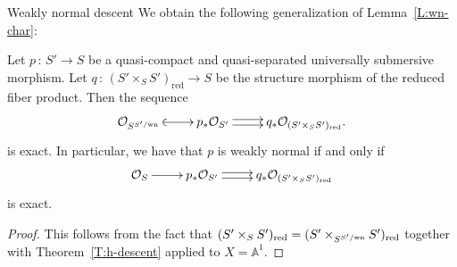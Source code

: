 \documentclass[a4paper,twoside,11pt]{amsart}[2009/07/02] %
\newcommand{\pref}[1]{\eqref{#1}}
\newcommand{\map}[3]{#1\,:\, #2\rightarrow #3}
\newcommand{\red}{\mathrm{red}}
\newcommand{\A}[1]{\mathbb{A}^{#1}}    %
\newcommand\sO{\mathcal{O}} %
\newcommand{\normcmd}[3]{%
#2%
\ifx\\#1\\%
^{\,\mathrm{#3}}%
\else%
^{#1/\mathrm{#3}}%
\fi%
}
\newcommand{\wn}[2]{\normcmd{#1}{#2}{wn}} %
\begin{document}
\begin{section}{Weakly normal descent}
We obtain the following generalization of Lemma~\pref{L:wn-char}:

\begin{corollary}
Let $\map{p}{S'}{S}$ be a quasi-compact and quasi-separated universally
submersive morphism. Let $\map{q}{(S'\times_S S')_\red}{S}$ be the structure
morphism of the reduced fiber product. Then the sequence
%
$$\xymatrix{
\sO_{\wn{S'}{S}}\ar@{(->}[r] & p_*\sO_{S'}\ar@<.5ex>[r] \ar@<-.5ex>[r] &
q_*\sO_{(S'\times_S S')_\red}.}$$
%
is exact. In particular, we have that $p$ is weakly normal if and only if
%
$$\xymatrix{
\sO_S\ar[r] & p_*\sO_{S'}\ar@<.5ex>[r] \ar@<-.5ex>[r] &
q_*\sO_{(S'\times_S S')_\red}}$$
%
is exact.
\end{corollary}
\begin{proof}
This follows from the fact that $(S'\times_S
S')_\red=(S'\times_{\wn{S'}{S}} S')_\red$ together with
Theorem~\pref{T:h-descent} applied to $X=\A{1}$.
\end{proof}


\end{section}

\end{document}
